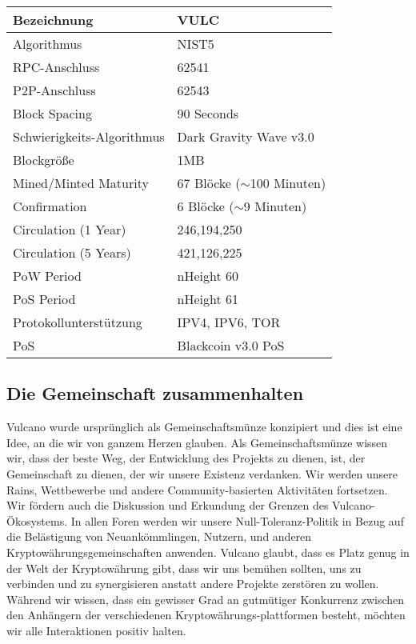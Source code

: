 \documentclass[A4paper, 12pt]{article}
\begin{document}
\begin{table}[h]
\centering
\begin{tabular}{@{}ll@{}}
\toprule
Bezeichnung & VULC \\ \midrule
Algorithmus & NIST5 \\
RPC-Anschluss & 62541 \\
P2P-Anschluss & 62543 \\
Block Spacing & 90 Seconds \\
Schwierigkeits-Algorithmus & Dark Gravity Wave v3.0 \\
Blockgröße & 1MB \\
Mined/Minted Maturity & 67 Blöcke ($\sim$100 Minuten) \\
Confirmation & 6 Blöcke ($\sim$9 Minuten) \\
Circulation (1 Year) & 246,194,250 \\
Circulation (5 Years) & 421,126,225 \\
PoW Period & nHeight 60 \\
PoS Period & nHeight 61 \\
Protokollunterstützung & IPV4, IPV6, TOR \\
PoS & Blackcoin v3.0 PoS \\ \bottomrule
\end{tabular}
\end{table}

\subsection{Die Gemeinschaft zusammenhalten}
Vulcano wurde ursprünglich als Gemeinschaftsmünze konzipiert und dies ist eine Idee, an die wir von ganzem Herzen glauben. Als Gemeinschaftsmünze wissen wir, dass der beste Weg, der Entwicklung des Projekts zu dienen, ist, der Gemeinschaft zu dienen, der wir unsere Existenz verdanken. Wir werden unsere Rains, Wettbewerbe und andere Community-basierten Aktivitäten fortsetzen. Wir fördern auch die Diskussion und Erkundung der Grenzen des Vulcano-Ökosystems. In allen Foren werden wir unsere Null-Toleranz-Politik in Bezug auf die Belästigung von Neuankömmlingen, Nutzern, und anderen Kryptowährungsgemeinschaften anwenden. Vulcano glaubt, dass es Platz genug in der Welt der Kryptowährung gibt, dass wir uns bemühen sollten, uns zu verbinden und zu synergisieren anstatt andere Projekte zerstören zu wollen. Während wir wissen, dass ein gewisser Grad an gutmütiger Konkurrenz zwischen den Anhängern der verschiedenen Kryptowährungs-plattformen besteht, möchten wir alle Interaktionen positiv halten. 
\end{document}
